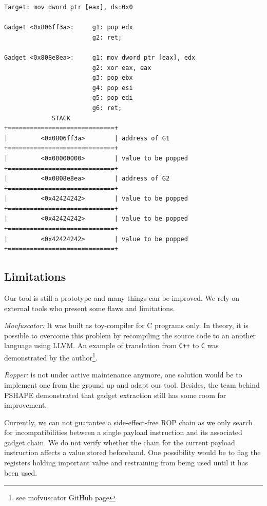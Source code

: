 \documentclass[10pt,twocolumn]{article}
\begin{document}
\begin{lstlisting}[float=h,aboveskip=\medskipamount,belowskip=-10pt,label=lst-stack,caption=
Stack preparation]
Target: mov dword ptr [eax], ds:0x0

Gadget <0x806ff3a>:     g1: pop edx
                        g2: ret;

Gadget <0x808e8ea>:     g1: mov dword ptr [eax], edx
                        g2: xor eax, eax
                        g3: pop ebx
                        g4: pop esi
                        g5: pop edi
                        g6: ret;
             STACK
+=============================+
|         <0x0806ff3a>        | address of G1
+=============================+
|         <0x00000000>        | value to be popped
+=============================+
|         <0x0808e8ea>        | address of G2
+=============================+
|         <0x42424242>        | value to be popped
+=============================+
|         <0x42424242>        | value to be popped
+=============================+
|         <0x42424242>        | value to be popped
+=============================+
\end{lstlisting}


\subsection{Limitations}
Our tool is still a prototype and many things can be improved. We
rely on external tools who present some flaws and limitations.

\textit{Movfuscator:} It was built as toy-compiler for C programs only. In
theory, it is possible to overcome this problem by recompiling the source
code to an another language using LLVM. An example of translation from
\texttt{C++} to \texttt{C} was demonstrated by the author\footnote{see
mofvuscator GitHub page}.

\textit{Ropper:} is not under active maintenance anymore, one solution would be
to implement one from the ground up and adapt our tool. Besides, the team
behind PSHAPE demonstrated that gadget extraction still has some room for
improvement.

Currently, we can not guarantee a side-effect-free ROP chain as we only search
for incompatibilities between a single payload instruction and its associated
gadget chain. We do not verify whether the chain for the current
payload instruction affects a value stored beforehand. One possibility would be
to flag the registers holding important value and restraining from being used
until it has been used.
\end{document}
